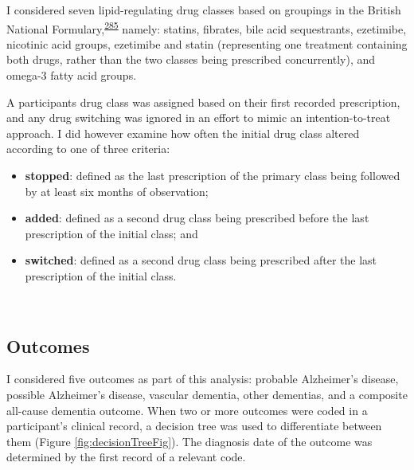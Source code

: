 \documentclass[a4paper, twoside]{templates/ociamthesis}
\providecommand{\tightlist}{%
  \setlength{\itemsep}{0pt}\setlength{\parskip}{0pt}}
\begin{document}
I considered seven lipid-regulating drug classes based on groupings in the British National Formulary,\textsuperscript{\protect\hyperlink{ref-wishart2017}{285}} namely: statins, fibrates, bile acid sequestrants, ezetimibe, nicotinic acid groups, ezetimibe and statin (representing one treatment containing both drugs, rather than the two classes being prescribed concurrently), and omega-3 fatty acid groups.

A participants drug class was assigned based on their first recorded prescription, and any drug switching was ignored in an effort to mimic an intention-to-treat approach. I did however examine how often the initial drug class altered according to one of three criteria:

\begin{itemize}
\tightlist
\item
  \textbf{stopped}: defined as the last prescription of the primary class being followed by at least six months of observation;
\item
  \textbf{added}: defined as a second drug class being prescribed before the last prescription of the initial class; and
\item
  \textbf{switched}: defined as a second drug class being prescribed after the last prescription of the initial class.
\end{itemize}

~

\hypertarget{cprd-outcomes}{%
\subsection{Outcomes}\label{cprd-outcomes}}

I considered five outcomes as part of this analysis: probable Alzheimer's disease, possible Alzheimer's disease, vascular dementia, other dementias, and a composite all-cause dementia outcome. When two or more outcomes were coded in a participant's clinical record, a decision tree was used to differentiate between them (Figure \ref{fig:decisionTreeFig}). The diagnosis date of the outcome was determined by the first record of a relevant code.
\end{document}
